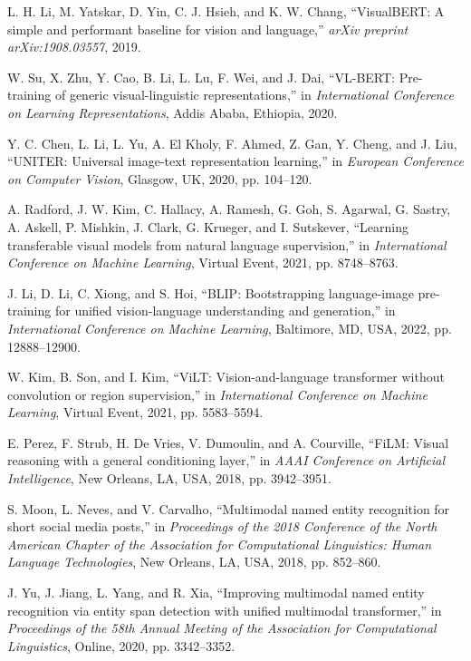 \documentclass[12pt,a4paper]{report}
\begin{document}
\begin{thebibliography}{99}
L. H. Li, M. Yatskar, D. Yin, C. J. Hsieh, and K. W. Chang, ``VisualBERT: A simple and performant baseline for vision and language,'' \textit{arXiv preprint arXiv:1908.03557}, 2019.

W. Su, X. Zhu, Y. Cao, B. Li, L. Lu, F. Wei, and J. Dai, ``VL-BERT: Pre-training of generic visual-linguistic representations,'' in \textit{International Conference on Learning Representations}, Addis Ababa, Ethiopia, 2020.

Y. C. Chen, L. Li, L. Yu, A. El Kholy, F. Ahmed, Z. Gan, Y. Cheng, and J. Liu, ``UNITER: Universal image-text representation learning,'' in \textit{European Conference on Computer Vision}, Glasgow, UK, 2020, pp. 104--120.

A. Radford, J. W. Kim, C. Hallacy, A. Ramesh, G. Goh, S. Agarwal, G. Sastry, A. Askell, P. Mishkin, J. Clark, G. Krueger, and I. Sutskever, ``Learning transferable visual models from natural language supervision,'' in \textit{International Conference on Machine Learning}, Virtual Event, 2021, pp. 8748--8763.

J. Li, D. Li, C. Xiong, and S. Hoi, ``BLIP: Bootstrapping language-image pre-training for unified vision-language understanding and generation,'' in \textit{International Conference on Machine Learning}, Baltimore, MD, USA, 2022, pp. 12888--12900.

W. Kim, B. Son, and I. Kim, ``ViLT: Vision-and-language transformer without convolution or region supervision,'' in \textit{International Conference on Machine Learning}, Virtual Event, 2021, pp. 5583--5594.

E. Perez, F. Strub, H. De Vries, V. Dumoulin, and A. Courville, ``FiLM: Visual reasoning with a general conditioning layer,'' in \textit{AAAI Conference on Artificial Intelligence}, New Orleans, LA, USA, 2018, pp. 3942--3951.

S. Moon, L. Neves, and V. Carvalho, ``Multimodal named entity recognition for short social media posts,'' in \textit{Proceedings of the 2018 Conference of the North American Chapter of the Association for Computational Linguistics: Human Language Technologies}, New Orleans, LA, USA, 2018, pp. 852--860.

J. Yu, J. Jiang, L. Yang, and R. Xia, ``Improving multimodal named entity recognition via entity span detection with unified multimodal transformer,'' in \textit{Proceedings of the 58th Annual Meeting of the Association for Computational Linguistics}, Online, 2020, pp. 3342--3352.


\end{thebibliography}
\end{document}
